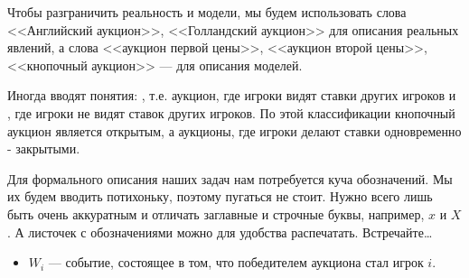 Чтобы разграничить реальность и модели, мы будем использовать слова <<Английский аукцион>>, <<Голландский аукцион>> для описания реальных явлений, а слова <<аукцион первой цены>>, <<аукцион второй цены>>, <<кнопочный аукцион>> --- для описания моделей.

Иногда вводят понятия: , т.е. аукцион, где игроки видят ставки других игроков и , где игроки не видят ставок других игроков. По этой классификации кнопочный аукцион является открытым, а аукционы, где игроки делают ставки одновременно - закрытыми.

Для формального описания наших задач нам потребуется куча обозначений. Мы их будем вводить потихоньку, поэтому пугаться не стоит. Нужно всего лишь быть очень аккуратным и отличать заглавные и строчные буквы, например, $x$ и $X$. А листочек с обозначениями можно для удобства распечатать. Встречайте\ldots

\newpage

\begin{center}
\end{center}

\begin{itemize}
\item $W_{i}$ --- событие, состоящее в том, что победителем аукциона стал игрок $ i $.
\end{itemize}


